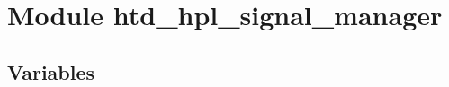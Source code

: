 %
%
%


\section{Module htd\_hpl\_signal\_manager}

    \label{htd_hpl_signal_manager}


  \subsection{Variables}

